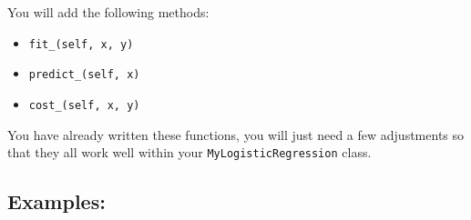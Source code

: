\documentclass[]{article}
\begin{document}
You will add the following methods:

\begin{itemize}
\item
  \texttt{fit\_(self,\ x,\ y)}
\item
  \texttt{predict\_(self,\ x)}
\item
  \texttt{cost\_(self,\ x,\ y)}
\end{itemize}

You have already written these functions, you will just need a few
adjustments so that they all work well within your
\texttt{MyLogisticRegression} class.

\hypertarget{examples-8}{%
\subsection{Examples:}\label{examples-8}}
\end{document}

